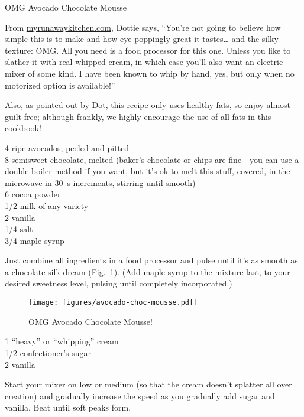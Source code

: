 \begin{entry}{OMG Avocado Chocolate Mousse}

\begin{open}
  From \url{myrunawaykitchen.com}, Dottie says, ``You’re not going to believe
  how simple this is to make and how eye-poppingly great it tastes… and the
  silky texture: OMG.  All you need is a food processor for this one.  Unless
  you like to slather it with real whipped cream, in which case you’ll also
  want an electric mixer of some kind.  I have been known to whip by hand,
  yes, but only when no motorized option is available!''

  Also, as pointed out by Dot, this recipe only uses healthy fats, so enjoy
  almost guilt free; although frankly, we highly encourage the use of all fats
  in this cookbook!
\end{open}
\begin{ingredients}
    4 ripe avocados, peeled and pitted\\
    \SI{8}{\ounce} semisweet chocolate, melted (baker’s chocolate or chips are fine---you can use a double boiler method if you want, but it's ok to melt this stuff, covered, in the microwave in \SI{30}{\second} increments, stirring until smooth)\\
    \SI{6}{\tblspoon} cocoa powder\\
    \SI{1/2}{\cup} milk of any variety\\
    \SI{2}{\teaspoon} vanilla\\
    \SI{1/4}{\teaspoon} salt\\
    \SI{3/4}{\cup} maple syrup
\end{ingredients}
Just combine all ingredients in a food processor and pulse until it’s as smooth
as a chocolate silk dream (Fig.~\ref{fig:mousse}).  (Add maple syrup to the
mixture last, to your desired sweetness level, pulsing until completely
incorporated.)
\begin{figure}
    \centering
    \texttt{[image: figures/avocado-choc-mousse.pdf]}
    \caption{OMG Avocado Chocolate Mousse!}
    \label{fig:mousse}
\end{figure}


\begin{ingredients}
    \SI{1}{\quart} ``heavy'' or ``whipping'' cream\\
    \SI{1/2}{\cup} confectioner's sugar\\
    \SI{2}{\teaspoon} vanilla
\end{ingredients}
Start your mixer on low or medium (so that the cream doesn't splatter all over
creation) and gradually increase the speed as you gradually add sugar and
vanilla.  Beat until soft peaks form.
\end{entry}

